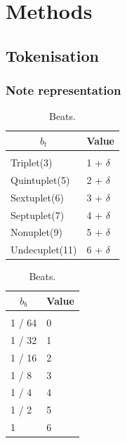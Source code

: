 \documentclass{article} %
\begin{document}
\section{Methods}\label{sec:proposedmethod}

\subsection{Tokenisation}\label{sec:tokenisation}
\subsubsection{Note representation}\label{sec:note}


\begin{table}[t]
\centering
\begin{minipage}{0.48\linewidth}
\centering
\caption{Beat type. $\delta$ = 7 for dotted note, 0 otherwise.}
\label{tab:bt}
\begin{center}
  \begin{tabular}{ll}
    \multicolumn{1}{c}{\bfseries $b_{t}$}  &\multicolumn{1}{c}{\bfseries Value}
  \\ \hline \\
  Triplet(3)        & 1 + $\delta$          \\
  Quintuplet(5)     & 2 + $\delta$          \\
  Sextuplet(6)      & 3 + $\delta$          \\
  Septuplet(7)      & 4 + $\delta$          \\
  Nonuplet(9)       & 5 + $\delta$          \\
  Undecuplet(11)    & 6 + $\delta$          \\
  \end{tabular}
  \end{center}
\end{minipage}\hfill
\begin{minipage}{0.48\linewidth}
\centering
\caption{Beats.}
\label{tab:duration}
\begin{center}
  \begin{tabular}{ll}
    \multicolumn{1}{c}{\bfseries $b_{b}$}  &\multicolumn{1}{c}{\bfseries Value}
   \\ \hline \\
  1 / 64  & 0          \\
  1 / 32  & 1          \\
  1 / 16  & 2          \\
  1 / 8  & 3          \\
  1 / 4  & 4          \\
  1 / 2  & 5          \\
  1 & 6          \\
  \end{tabular}
  \end{center}
\end{minipage}
\end{table}
\end{document}
